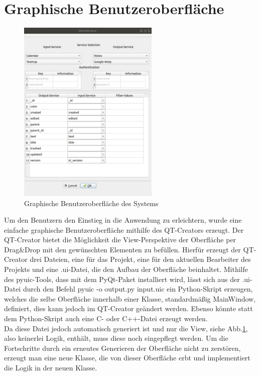 \section{Graphische Benutzeroberfläche}
\begin{figure}
	\centering
	\includegraphics[width=0.6\textwidth]{pics/gui.png}	
	\caption{Graphische Benutzeroberfläche des Systems}
	\label{fig:gui}
\end{figure}
Um den Benutzern den Einstieg in die Anwendung zu erleichtern, wurde eine einfache graphische Benutzeroberfläche mithilfe des QT-Creators erzeugt. Der QT-Creator bietet die Möglichkeit die View-Perspektive der Oberfläche per Drag\&Drop mit den gewünschten Elementen zu befüllen. Hierfür erzeugt der QT-Creator drei Dateien, eine für das Projekt, eine für den aktuellen Bearbeiter des Projekts und eine \glqq .ui\grqq{}-Datei, die den Aufbau der Oberfläche beinhaltet. Mithilfe des pyuic-Tools, dass mit dem PyQt-Paket installiert wird, lässt sich aus der .ui-Datei durch den Befehl \glqq pyuic -o output.py input.uic\grqq{} ein Python-Skript erzeugen, welches die selbe Oberfläche innerhalb einer Klasse, standardmäßig MainWindow, definiert, dies kann jedoch im QT-Creator geändert werden. Ebenso könnte statt dem Python-Skript auch eine C- oder C++-Datei erzeugt werden. \\
Da diese Datei jedoch automatisch generiert ist und nur die View, siehe Abb.\ref{fig:gui}, also keinerlei Logik, enthält, muss diese noch eingepflegt werden. Um die Fortschritte durch ein erneutes Generieren der Oberfläche nicht zu zerstören, erzeugt man eine neue Klasse, die von dieser Oberfläche erbt und implementiert die Logik in der neuen Klasse. \\
